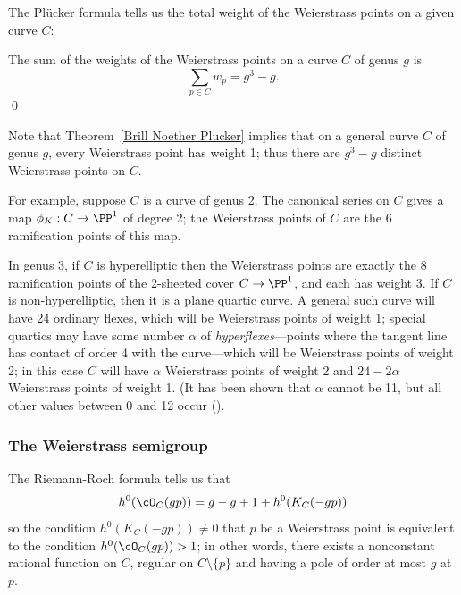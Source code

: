 The Pl\"ucker formula tells us  the total weight of the Weierstrass points on a given curve $C$:

\begin{corollary}\label{plucker formula}
The sum of the weights of the Weierstrass points on a curve $C$ of genus $g$ is
$$
\sum_{p \in C} w_p = g^3-g.
$$\qed
\end{corollary}

Note that Theorem~\ref{Brill Noether Plucker} implies that on a general curve $C$ of genus $g$, every Weierstrass point has weight 1; thus there are $g^3-g$ distinct Weierstrass points on $C$.


For example, suppose $C$ is a curve of genus 2. The canonical series on $C$ gives a map $\phi_K : C \to \PP^1$ of degree 2; the Weierstrass points of $C$ are the 6 ramification points of this map. 

In genus 3, if $C$ is hyperelliptic then the Weierstrass points are exactly the 8 ramification points of the 2-sheeted cover $C \to \PP^1$, and each has weight 3. If $C$ is non-hyperelliptic, then it is a plane quartic curve. A general such curve will have 24 ordinary flexes, which will be Weierstrass points of weight 1; special quartics may have some number $\alpha$ of \emph{hyperflexes}---points where the tangent line has contact of order 4 with the curve---which will be Weierstrass points of weight 2; in this case $C$ will have $\alpha$ Weierstrass points of weight 2 and $24-2\alpha$ Weierstrass points of weight 1. (It has been shown that $\alpha$ cannot be 11, but  all  other values  between 0 and 12 occur (\cite{Vermeulen}).


\subsubsection{The Weierstrass semigroup} 

The Riemann-Roch formula tells us that
$$
h^0(\cO_C(gp)) = g - g + 1 + h^0(K_C(-gp))
$$
so the condition $h^0(K_C(-gp)) \neq 0$ that $p$ be a Weierstrass point is equivalent to the condition $h^0(\cO_C(gp)) > 1$; in other words, there exists a nonconstant rational function on $C$, regular on $C \setminus \{p\}$ and having a pole of order at most $g$ at $p$.

